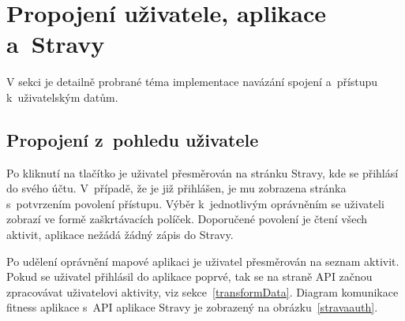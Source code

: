 \section{Propojení uživatele, aplikace a~Stravy}
\label{userAppStravaConnection}
V sekci je detailně probrané téma implementace navázání spojení a~přístupu k~uživatelským datům.
\subsection{Propojení z~pohledu uživatele}
Po kliknutí na tlačítko  je uživatel přesměrován na stránku Stravy, kde se přihlásí do svého účtu. V~případě, že je již přihlášen, je mu zobrazena stránka s~potvrzením povolení přístupu.
Výběr k~jednotlivým oprávněním se uživateli zobrazí ve formě zaškrtávacích políček. Doporučené povolení je čtení všech aktivit, aplikace nežádá žádný zápis do Stravy. 

Po udělení oprávnění mapové aplikaci je uživatel přesměrován na seznam aktivit. Pokud se uživatel přihlásil do aplikace poprvé, tak se na straně API začnou zpracovávat uživatelovi aktivity, viz sekce~\ref{transformData}. Diagram komunikace fitness aplikace s~API aplikace Stravy je zobrazený na obrázku~\ref{stravaauth}.

